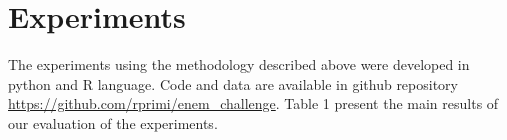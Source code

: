\documentclass{article}
\begin{document}


\section{Experiments}

The experiments using the methodology described above were developed in python and R language. Code and data are available in github repository \url{https://github.com/rprimi/enem_challenge}. Table 1 present the main results of our evaluation of the experiments.


\end{document}
